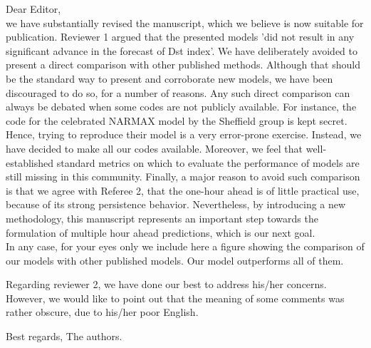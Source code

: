 \documentclass{letter}
\begin{document}
Dear Editor,\\

we have substantially revised the manuscript, which we believe is now suitable for publication.
Reviewer 1 argued that the presented models 'did not result in any significant advance in the forecast of Dst index'.
We have deliberately avoided to present a direct comparison with other published methods. Although that should be the standard way to present and corroborate new models, we have been discouraged to do so, for a number of reasons. Any such direct comparison can always be debated when some codes are not publicly available. For instance, the code for the celebrated NARMAX model by the Sheffield group is kept secret. Hence, trying to reproduce their model is a very error-prone exercise. Instead, we have decided to make all our codes available.   
Moreover, we feel that well-established standard metrics on which to evaluate the performance of models are still missing in this community.
Finally, a major reason to avoid such comparison is that we agree with Referee 2, that the one-hour ahead is of little practical use, because of its strong persistence behavior. Nevertheless, by introducing a new methodology, this manuscript represents an important step towards the formulation of multiple hour ahead predictions, which is our next goal.\\

In any case, for your eyes only we include here a figure showing the comparison of our models with other published models. Our model outperforms all of them.

Regarding reviewer 2, we have done our best to address his/her concerns. However, we would like to point out that the meaning of some comments was rather obscure, due to his/her poor English.

Best regards,
The authors.

\hfill
\end{document}
